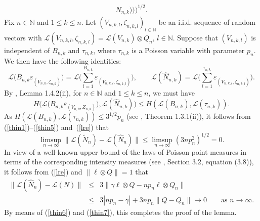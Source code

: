 \documentclass[number,citesort,seceqn,dvips]{arxbj}
\newcommand{\eqref}[1]{(\ref{#1})}
\newcommand{\NN}{\mathbb{N}}
\newcommand{\LLL}{{\mathcal L}}
\begin{document}
\begin{pf}
\begin{eqnarray}
N_{n,k} ) \bigr) \Biggr)^{1/2}.\nonumber
\end{eqnarray}
%
Fix $n\in\NN$ and $1\le k\le n$. Let
$(V_{n,k,l},\zeta_{n,k,l})_{l\in\NN}$ be an i.i.d. sequence of random
vectors with $\LLL(V_{n,k,l},\zeta_{n,k,l})=\LLL(V_{n,k})\otimes Q_n$,
$l\in\NN$. Suppose that $(V_{n,k,l})$ is independent of $B_{n,k}$ and
$\tau_{n,k}$, where $\tau_{n,k}$ is a Poisson\vadjust{\goodbreak} variable with parameter
$p_n$. We then have the following identities:
%
\[
\LLL \bigl(B_{n,k}
\varepsilon_{(V_{n,k},\zeta_{n,k})} \bigr)   =
\LLL \Biggl(\sum_{l=1}^{B_{n,k}}
\varepsilon_{(V_{n,k,l},\zeta_{n,k,l})} \Biggr),\qquad  \LLL
(\widehat N_{n,k})   =   \LLL \Biggl(\sum_{l=1}^{\tau_{n,k}}
\varepsilon_{(V_{n,k,l},\zeta_{n,k,l})} \Biggr) .
\]
%
By \cite{Re93}, Lemma 1.4.2(ii), for $n\in\NN$ and $1\le k\le n$, we
must have
%
\begin{equation}\label{thin5}
H \bigl(\LLL \bigl(B_{n,k}
\varepsilon_{(V_{n,k},Z_{n,k})} \bigr),\LLL (\widehat
N_{n,k} ) \bigr)  \le H(\LLL(B_{n,k}),\LLL(\tau_{n,k})) .
\end{equation}
%
As $H(\LLL(B_{n,k}),\LLL(\tau_{n,k}))\le3^{1/2}p_n$ (see
\cite{Re93}, Theorem 1.3.1(ii)), it follows from
\eqref{thin1}--\eqref{thin5} and~\eqref{lre} that
%
\begin{equation}\label{thin6}
\limsup_{n\to\infty}\|\LLL(\tilde N_n)-\LLL(\hat
N_n)\| \le \limsup_{n\to\infty}(3np_n^2)^{1/2}=0 .
\end{equation}
%
In view of a well-known upper bound of the laws of Poisson point
measures in terms of the corresponding intensity measures (see
\cite{Re93}, Section 3.2, equation (3.8)), it follows from \eqref{lre}
and $\|\ell\otimes Q\|=1$ that
%
\begin{eqnarray*}\label{thin7}
\|\LLL(\widehat N_n)-\LLL(N)\| & \le&
3\|\gamma\ell\otimes Q-np_n\ell\otimes Q_n\|\\
& \le& 3 |np_n-\gamma| + 3 np_n \|Q-Q_n\| \to0\qquad \mbox{as }
n\to\infty .
\end{eqnarray*}
%
By means of \eqref{thin6} and \eqref{thin7}, this completes the proof
of the lemma.
\end{pf}

%
\end{document}
